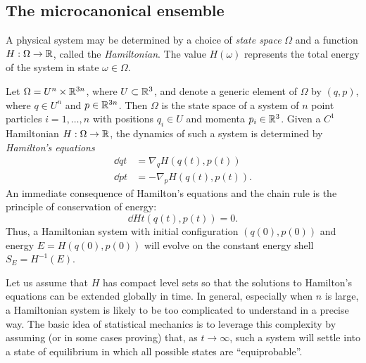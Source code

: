 
\subsection{The microcanonical ensemble}

A physical system may be determined by a choice of \emph{state space} $\Omega$ and a function
$H : \Omega \rightarrow {\mathbb R}$, called the \emph{Hamiltonian}. The value $H(\omega)$ represents the
total energy of the system in state $\omega\in\Omega$.

\begin{example}
Let $\Omega = U^n \times {\mathbb R}^{3n}$, where $U \subset {\mathbb R}^3$, and denote a generic element of
$\Omega$ by $(q, p)$, where $q \in U^n$ and $p \in {\mathbb R}^{3n}$. Then $\Omega$ is the state
space of a system of $n$ point particles $i = 1, \ldots, n$ with positions $q_i \in U$
and momenta $p_i \in {\mathbb R}^3$. Given a $C^1$ Hamiltonian $H : \Omega \rightarrow {\mathbb R}$,
the dynamics of such a system is determined by \emph{Hamilton's equations}
\begin{align}
\dd{q}{t} &= \nabla_q H(q(t), p(t)) \\
\dd{p}{t} &= -\nabla_p H(q(t), p(t)).
\end{align}
An immediate consequence of Hamilton's equations and the chain rule is the principle
of conservation of energy:
\begin{equation}
\dd{H}{t}(q(t), p(t)) = 0.
\end{equation}
Thus, a Hamiltonian system with initial configuration $(q(0), p(0))$ and energy
$E = H(q(0), p(0))$ will evolve on the constant energy shell $S_E = H^{-1}(E)$.

Let us assume that $H$ has compact level sets so that the solutions to Hamilton's
equations can be extended globally in time. In general, especially when $n$ is large,
a Hamiltonian system is likely to be too complicated to understand in a precise way.
The basic idea of statistical mechanics is to leverage this complexity by assuming
(or in some cases proving) that, as $t\to\infty$, such a system will settle into a
state of equilibrium in which all possible states are ``equiprobable''.
\end{example}

